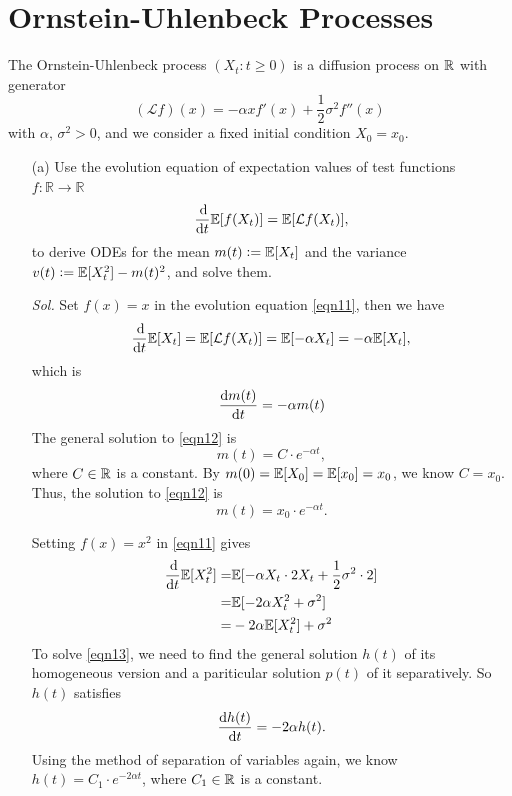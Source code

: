 \section{Ornstein-Uhlenbeck Processes}

The Ornstein-Uhlenbeck process $(X_t : t \ge 0)$ is a diffusion process on $\mathbb{R}$ with generator 
$$
(\mathcal{L}f)(x) = - \alpha x f'(x) + \frac{1}{2}\sigma^2 f''(x)
$$
with $\alpha,\,\sigma^2 > 0$, and we consider a fixed initial condition $X_0 = x_0$.

\begin{enumerate}
    \item[(a)] Use the evolution equation of expectation values of test functions $f: \mathbb{R} \to \mathbb{R}$
    \begin{equation}\label{eqn11}
        \frac{\dif}{\dif t} \mbb{E} [f(X_t)]  = \mbb{E} [\mathcal{L}f(X_t)],
    \end{equation}
    to derive ODEs for the mean $m(t):=\mathbb{E}[X_t]$ and the variance $v(t) := \mathbb{E}[X_t^2] - m(t)^2$, and solve them.

    \textit{ Sol. } Set $f(x) = x$ in the evolution equation \eqref{eqn11}, then we have 
    \begin{equation*}
        \frac{\dif}{\dif t} \mbb{E} [X_t]  = \mbb{E} [\mathcal{L}f(X_t)] = \mbb{E} [- \alpha X_t] = -\alpha \mbb{E} [X_t],
    \end{equation*}
    which is 
    \begin{equation}\label{eqn12}
        \frac{\dif m(t)}{\dif t} = - \alpha m(t)
    \end{equation}
    The general solution to \eqref{eqn12} is 
    \begin{equation*}
        m(t) = C \cdot e^{-\alpha t},
    \end{equation*}
    where $C \in \mathbb{R}$ is a constant. By $m(0) = \mathbb{E}[X_0] = \mathbb{E}[x_0] = x_0$, we know $C = x_0$. Thus, the solution to \eqref{eqn12} is 
    \begin{equation}
        m(t) = x_0 \cdot e^{-\alpha t}.
    \end{equation}

    Setting $f(x) = x^2$ in \eqref{eqn11} gives 
    \begin{align}
        \frac{\dif}{\dif t} \mbb{E}[X_t^2] = & \mbb{E} [ - \alpha X_t \cdot 2X_t + \frac{1}{2}\sigma^2 \cdot 2] \notag \\ 
        = & \mbb{E} [ -2 \alpha X_t^2 + \sigma^2] \notag \\ 
        = & -2 \alpha \mbb{E} [X_t^2] + \sigma^2 \label{eqn13}
    \end{align}
    To solve \eqref{eqn13}, we need to find the general solution $h(t)$ of its homogeneous version and a pariticular solution $p(t)$ of it separatively. So $h(t)$ satisfies 
    \begin{equation*}
        \frac{\dif h(t)}{\dif t} = -2 \alpha h(t).
    \end{equation*}
    Using the method of separation of variables again, we know $h(t) = C_1 \cdot e^{-2\alpha t}$, where $C_1 \in \mathbb{R}$ is a constant. 


\end{enumerate}
